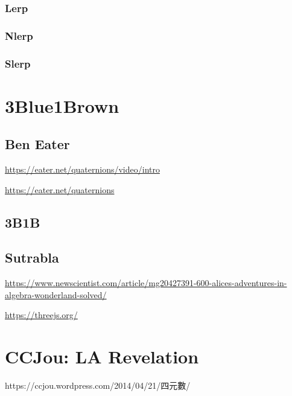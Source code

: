 \documentclass[
]{book}
\theoremstyle{definition}
\theoremstyle{definition}
\theoremstyle{definition}
\theoremstyle{definition}
\theoremstyle{remark}
\begin{document}
\hypertarget{lerp}{%
\subsubsection{Lerp}\label{lerp}}

\hypertarget{nlerp}{%
\subsubsection{Nlerp}\label{nlerp}}

\hypertarget{slerp}{%
\subsubsection{Slerp}\label{slerp}}

\hypertarget{blue1brown}{%
\section{3Blue1Brown}\label{blue1brown}}

\hypertarget{ben-eater}{%
\subsection{Ben Eater}\label{ben-eater}}

\url{https://eater.net/quaternions/video/intro}

\url{https://eater.net/quaternions}

\hypertarget{b1b}{%
\subsection{3B1B}\label{b1b}}

\hypertarget{sutrabla}{%
\subsection{Sutrabla}\label{sutrabla}}

\url{https://www.newscientist.com/article/mg20427391-600-alices-adventures-in-algebra-wonderland-solved/}

\url{https://threejs.org/}

\hypertarget{ccjou-la-revelation}{%
\section{CCJou: LA Revelation}\label{ccjou-la-revelation}}

\begin{CJK}{UTF8}{bsmi}
https://ccjou.wordpress.com/2014/04/21/四元數/
\end{CJK}
\end{document}
